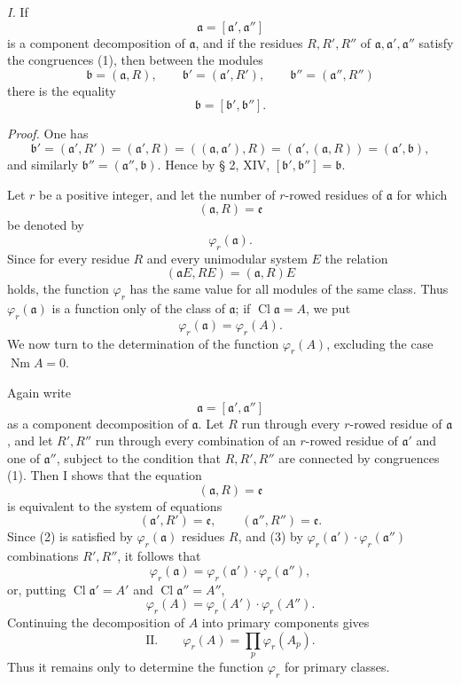 \documentclass[11pt,a4paper]{article}
\newcommand{\Cl}{\operatorname{Cl}}
\newcommand{\Nm}{\operatorname{Nm}}
\begin{document}
\emph{I.} If
\[
 \mathfrak a=[\mathfrak a',\mathfrak a'']
\]
is a component decomposition of $\mathfrak a$, and if the residues $R,R',R''$ of $\mathfrak a,\mathfrak a',\mathfrak a''$ satisfy the congruences (1), then between the modules
\[
 \mathfrak b=(\mathfrak a,R),
 \qquad
 \mathfrak b'=(\mathfrak a',R'),
 \qquad
 \mathfrak b''=(\mathfrak a'',R'')
\]
there is the equality
\[
 \mathfrak b=[\mathfrak b',\mathfrak b''].
\]

\emph{Proof.} One has
\[
 \mathfrak b'=(\mathfrak a',R')=(\mathfrak a',R)=((\mathfrak a,\mathfrak a'),R)
 =(\mathfrak a',(\mathfrak a,R))=(\mathfrak a',\mathfrak b),
\]
and similarly $\mathfrak b''=(\mathfrak a'',\mathfrak b)$. Hence by § 2, XIV, $[\mathfrak b',\mathfrak b'']=\mathfrak b$.

Let $r$ be a positive integer, and let the number of $r$-rowed residues of $\mathfrak a$ for which
\[
 (\mathfrak a,R)=\mathfrak e
\]
be denoted by
\[
 \varphi_r(\mathfrak a).
\]
Since for every residue $R$ and every unimodular system $E$ the relation
\[
 (\mathfrak aE,RE)=(\mathfrak a,R)E
\]
holds, the function $\varphi_r$ has the same value for all modules of the same class. Thus $\varphi_r(\mathfrak a)$ is a function only of the class of $\mathfrak a$; if $\Cl\mathfrak a=A$, we put
\[
 \varphi_r(\mathfrak a)=\varphi_r(A).
\]
We now turn to the determination of the function $\varphi_r(A)$, excluding the case $\Nm A=0$.

Again write
\[
 \mathfrak a=[\mathfrak a',\mathfrak a'']
\]
as a component decomposition of $\mathfrak a$. Let $R$ run through every $r$-rowed residue of $\mathfrak a$, and let $R',R''$ run through every combination of an $r$-rowed residue of $\mathfrak a'$ and one of $\mathfrak a''$, subject to the condition that $R,R',R''$ are connected by congruences (1). Then I shows that the equation
\begin{equation}
 (\mathfrak a,R)=\mathfrak e
\tag{2}
\end{equation}
is equivalent to the system of equations
\begin{equation}
 (\mathfrak a',R')=\mathfrak e,
 \qquad
 (\mathfrak a'',R'')=\mathfrak e.
\tag{3}
\end{equation}
Since (2) is satisfied by $\varphi_r(\mathfrak a)$ residues $R$, and (3) by $\varphi_r(\mathfrak a')\cdot\varphi_r(\mathfrak a'')$ combinations $R',R''$, it follows that
\[
 \varphi_r(\mathfrak a)=\varphi_r(\mathfrak a')\cdot\varphi_r(\mathfrak a''),
\]
or, putting $\Cl\mathfrak a'=A'$ and $\Cl\mathfrak a''=A''$,
\[
 \varphi_r(A)=\varphi_r(A')\cdot\varphi_r(A'').
\]
Continuing the decomposition of $A$ into primary components gives
\[
\text{II.}\qquad
 \varphi_r(A)=\prod_p \varphi_r(A_p).
\]
Thus it remains only to determine the function $\varphi_r$ for primary classes.
\end{document}
